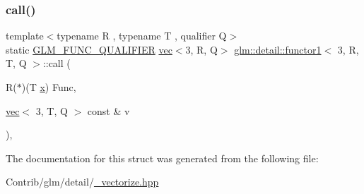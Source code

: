 \subsubsection{\texorpdfstring{call()}{call()}}
{\footnotesize\ttfamily template$<$typename R , typename T , qualifier Q$>$ \\
static \mbox{\hyperlink{setup_8hpp_a33fdea6f91c5f834105f7415e2a64407}{G\+L\+M\+\_\+\+F\+U\+N\+C\+\_\+\+Q\+U\+A\+L\+I\+F\+I\+ER}} \mbox{\hyperlink{structglm_1_1vec}{vec}}$<$3, R, Q$>$ \mbox{\hyperlink{structglm_1_1detail_1_1functor1}{glm\+::detail\+::functor1}}$<$ 3, R, T, Q $>$\+::call (\begin{DoxyParamCaption}\item[{R($\ast$)(T \mbox{\hyperlink{_s_d_l__opengl_8h_ad0e63d0edcdbd3d79554076bf309fd47}{x}})}]{Func,  }\item[{\mbox{\hyperlink{structglm_1_1vec}{vec}}$<$ 3, T, Q $>$ const \&}]{v }\end{DoxyParamCaption})\hspace{0.3cm}{\ttfamily [inline]}, {\ttfamily [static]}}



The documentation for this struct was generated from the following file\+:\begin{DoxyCompactItemize}
\item 
Contrib/glm/detail/\mbox{\hyperlink{__vectorize_8hpp}{\+\_\+vectorize.\+hpp}}\end{DoxyCompactItemize}
